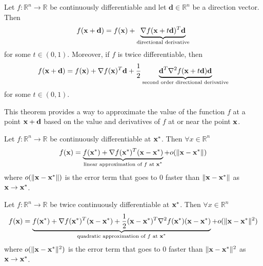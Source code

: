 \begin{theorem}
  Let $f: \mathbb R^n \to \mathbb R$ be continuously differentiable and let $\textbf{d} \in \mathbb R^n$ be a direction vector. Then
  $$f(\textbf{x} + \textbf{d}) = f(\textbf{x}) + \underbrace{\nabla f(\textbf{x} + t\textbf{d})^T \textbf{d}}_{\text{directional derivative}}$$ for some $t \in (0,1)$. Moreover, if $f$ is twice differentiable, then
  $$f(\textbf{x} + \textbf{d}) = f(\textbf{x}) + \nabla f(\textbf{x})^T\textbf{d} + \frac{1}{2} \underbrace{\textbf{d}^T \nabla^2 f(\textbf{x} + t\textbf{d}) \textbf{d}}_{\text{second order directional derivative}}$$ for some $t \in (0,1)$.

  \bigskip
  This theorem provides a way to approximate the value of the function $f$ at a point $\textbf{x} + \textbf{d}$ based on the value and derivatives of $f$ at or near the point $\textbf{x}$.
\end{theorem}
\begin{theorem}
  Let $f: \mathbb R^n \to \mathbb R$ be continuously differentiable at $\textbf{x}^*$. Then $\forall x \in \mathbb R^n$
  $$f(\textbf{x}) = \underbrace{f(\textbf{x}^*) + \nabla f(\textbf{x}^*)^T (\textbf{x} - \textbf{x}^*)}_{\text{linear approximation of $f$ at $\textbf{x}^*$}} + o(\| \textbf{x} - \textbf{x}^* \|)$$
  where $o(\| \textbf{x} - \textbf{x}^* \|)$ is the error term that goes to 0 faster than $\| \textbf{x} - \textbf{x}^* \|$ as $\textbf{x} \to \textbf{x}^*$.

  Let $f: \mathbb R^n \to \mathbb R$ be twice continuously differentiable at $\textbf{x}^*$. Then $\forall x \in \mathbb R^n$
  $$f(\textbf{x}) = \underbrace{f(\textbf{x}^*) + \nabla f(\textbf{x}^*)^T (\textbf{x} - \textbf{x}^*) + \frac{1}{2} (\textbf{x} - \textbf{x}^*)^T \nabla^2 f(\textbf{x}^*) (\textbf{x} - \textbf{x}^*)}_{\text{quadratic approximation of $f$ at $\textbf{x}^*$}} + o(\| \textbf{x} - \textbf{x}^* \|^2)$$
  where $o(\| \textbf{x} - \textbf{x}^* \|^2)$ is the error term that goes to 0 faster than $\| \textbf{x} - \textbf{x}^* \|^2$ as $\textbf{x} \to \textbf{x}^*$.
\end{theorem}
